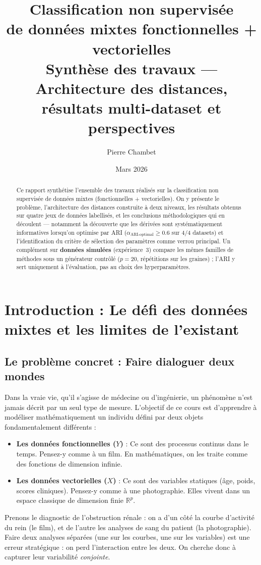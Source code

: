 \documentclass[11pt, a4paper]{article}
\title{%
  \vspace{-1cm}
  \textbf{Classification non supervisée} \\[0.3em]
  \textbf{de données mixtes fonctionnelles + vectorielles} \\[0.5em]
  \Large Synthèse des travaux — Architecture des distances, \\
  résultats multi-dataset et perspectives
}
\author{Pierre Chambet}
\date{Mars 2026}
\begin{document}
\maketitle
\thispagestyle{fancy}

\begin{abstract}
Ce rapport synthétise l'ensemble des travaux réalisés sur la classification
non supervisée de données mixtes (fonctionnelles + vectorielles). On y
présente le problème, l'architecture des distances construite à deux niveaux,
les résultats obtenus sur quatre jeux de données labellisés, et les
conclusions méthodologiques qui en découlent — notamment la découverte que
les dérivées sont systématiquement informatives lorsqu'on optimise par ARI
($\alpha_{\text{ARI-optimal}} \geq 0.6$ sur 4/4 datasets) et l'identification du critère de sélection des paramètres
comme verrou principal.
Un complément sur \textbf{données simulées} (expérience~3) compare les mêmes
familles de méthodes sous un générateur contrôlé ($p = 20$, répétitions sur
les graines) ; l'ARI y sert uniquement à l'évaluation, pas au choix des
hyperparamètres.
\end{abstract}

\tableofcontents
\newpage

\section{Introduction : Le défi des données mixtes et les limites de l'existant}

\subsection{Le problème concret : Faire dialoguer deux mondes}
Dans la vraie vie, qu'il s'agisse de médecine ou d'ingénierie, un phénomène n'est jamais décrit par un seul type de mesure. L'objectif de ce cours est d'apprendre à modéliser mathématiquement un individu défini par deux objets fondamentalement différents :
\begin{itemize}
    \item \textbf{Les données fonctionnelles ($Y$)} : Ce sont des processus continus dans le temps. Pensez-y comme à un film. En mathématiques, on les traite comme des fonctions de dimension infinie.
    \item \textbf{Les données vectorielles ($X$)} : Ce sont des variables statiques (âge, poids, scores cliniques). Pensez-y comme à une photographie. Elles vivent dans un espace classique de dimension finie $\mathbb{R}^p$.
\end{itemize}
Prenons le diagnostic de l'obstruction rénale : on a d'un côté la courbe d'activité du rein (le film), et de l'autre les analyses de sang du patient (la photographie). Faire deux analyses séparées (une sur les courbes, une sur les variables) est une erreur stratégique : on perd l'interaction entre les deux. On cherche donc à capturer leur variabilité \textit{conjointe}.
\end{document}
